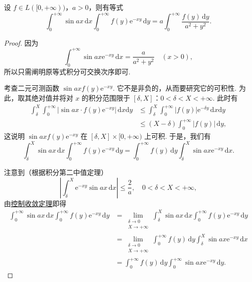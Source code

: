 \documentclass[../../main.tex]{subfiles}%
\begin{document}
\begin{example}
设 \( f \in L([0, +\infty)) \)，\( a > 0 \)，则有等式
\[
\int_0^{+\infty} \sin ax \, \mathrm{d}x \int_0^{+\infty} f(y) \mathrm{e}^{-xy} \, \mathrm{d}y = a \int_0^{+\infty} \frac{f(y) \, \mathrm{d}y}{a^2 + y^2}.
\]
\end{example}
\begin{proof}
因为
\[
\int_0^{+\infty} \sin ax \mathrm{e}^{-xy} \, \mathrm{d}x = \frac{a}{a^2 + y^2} \quad (x > 0),
\]
所以只需阐明原等式积分可交换次序即可.

考查二元可测函数 \( \sin ax f(y) \mathrm{e}^{-xy} \). 它不是非负的，从而要研究它的可积性. 为此，取其绝对值并将对 \( x \) 的积分范围限于 \( [\delta, X] \)：\( 0 < \delta < X < +\infty \). 此时有
\begin{align*}
\int_{\delta}^{X} \int_0^{+\infty} |\sin ax \cdot f(y) \mathrm{e}^{-xy}| \, \mathrm{d}x\mathrm{d}y &\leqslant \int_{\delta}^{X} \int_0^{+\infty} |f(y)| \mathrm{e}^{-\delta y} \, \mathrm{d}x\mathrm{d}y \\
&\leqslant (X - \delta) \int_0^{+\infty} |f(y)| \, \mathrm{d}y,
\end{align*}
这说明 \( \sin ax f(y) \mathrm{e}^{-xy} \) 在 \( [\delta, X] \times [0, +\infty) \) 上可积. 于是，我们有
\[
\int_{\delta}^{X} \sin ax \, \mathrm{d}x \int_0^{+\infty} f(y) \mathrm{e}^{-xy} \, \mathrm{d}y = \int_0^{+\infty} f(y) \, \mathrm{d}y \int_{\delta}^{X} \sin ax \mathrm{e}^{-xy} \, \mathrm{d}x.
\]

注意到（根据积分第二中值定理）
\[
\left| \int_{\delta}^{X} \mathrm{e}^{-xy} \sin ax \, \mathrm{d}x \right| \leqslant \frac{2}{a}, \quad 0 < \delta < X < +\infty,
\]
由\hyperref[theorem:控制收敛定理]{控制收敛定理}即得
\begin{align*}
\int_0^{+\infty} \sin ax \, \mathrm{d}x \int_0^{+\infty} f(y) \mathrm{e}^{-xy} \, \mathrm{d}y &= \lim_{\substack{\delta \to 0 \\ X \to +\infty}} \int_{\delta}^{X} \sin ax \, \mathrm{d}x \int_0^{+\infty} f(y) \mathrm{e}^{-xy} \, \mathrm{d}y \\
&= \lim_{\substack{\delta \to 0 \\ X \to +\infty}} \int_0^{+\infty} f(y) \, \mathrm{d}y \int_{\delta}^{X} \sin ax \mathrm{e}^{-xy} \, \mathrm{d}x \\
&= \int_0^{+\infty} f(y) \, \mathrm{d}y \int_0^{+\infty} \sin ax \mathrm{e}^{-xy} \, \mathrm{d}y.
\end{align*}
\end{proof}
\end{document}
